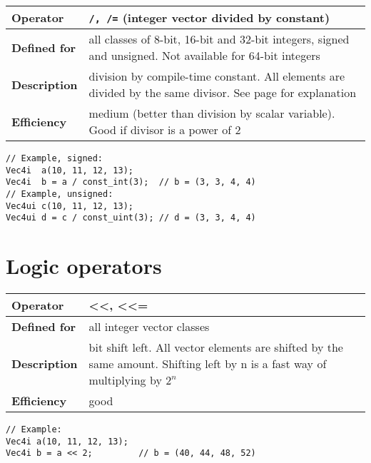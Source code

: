 \documentclass[vcl_manual.tex]{subfiles}
\begin{document}
\begin{tabular}{|p{25mm}|p{100mm}|}
\hline
\bfseries Operator & \texttt{/, /=}  (integer vector divided by constant) \\ \hline
\bfseries Defined for & all classes of 8-bit, 16-bit and 32-bit integers, signed and unsigned. Not available for 64-bit integers \\ \hline
\bfseries Description & division by compile-time constant. All elements are divided by the same divisor. See page \pageref{IntegerDivision} for explanation \\ \hline
\bfseries Efficiency & medium (better than division by scalar variable). \newline Good if divisor is a power of 2 \\ \hline
\end{tabular}
\begin{lstlisting}[frame=none]
// Example, signed:
Vec4i  a(10, 11, 12, 13);
Vec4i  b = a / const_int(3);  // b = (3, 3, 4, 4)
// Example, unsigned:
Vec4ui c(10, 11, 12, 13);
Vec4ui d = c / const_uint(3); // d = (3, 3, 4, 4)
\end{lstlisting}


\section{Logic operators} \label{LogicOperators}

\begin{tabular}{|p{25mm}|p{100mm}|}
\hline
\bfseries Operator & \textless\textless, \textless\textless= \\ \hline
\bfseries Defined for & all integer vector classes \\ \hline
\bfseries Description & bit shift left. All vector elements are shifted by the same amount. \newline
Shifting left by n is a fast way of multiplying by $2^n$ \\ \hline
\bfseries Efficiency & good \\ \hline
\end{tabular}
\begin{lstlisting}[frame=none]
// Example:
Vec4i a(10, 11, 12, 13);
Vec4i b = a << 2;         // b = (40, 44, 48, 52)
\end{lstlisting}
\end{document}
